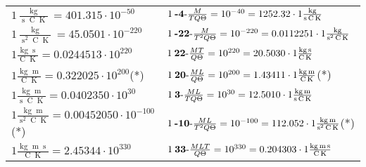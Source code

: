 \begin{center}
\begin{longtable}{l l}
{\color{black}$1 \bm{\mathrm{ }}\frac{\operatorname{kg}}{\operatorname{s}\operatorname{C}\operatorname{K}} = 401.315\cdot10^{-50} $}&
	{\color{black}$1\:\text{\textbf{-4}-} \frac{M}{TQ\Theta}=10^{-40} = 1252.32 \cdot 1 \bm{\mathrm{ }}\frac{\operatorname{kg}}{\operatorname{s}\operatorname{C}\operatorname{K}}$}\\
{\color{black}$1 \bm{\mathrm{ }}\frac{\operatorname{kg}}{\operatorname{s}^2\operatorname{C}\operatorname{K}} = 45.0501\cdot10^{-220} $}&
	{\color{black}$1\:\text{\textbf{-22}-} \frac{M}{T^2Q\Theta}=10^{-220} = 0.0112251 \cdot 1 \bm{\mathrm{ }}\frac{\operatorname{kg}}{\operatorname{s}^2\operatorname{C}\operatorname{K}}$}\\
{\color{black}$1 \bm{\mathrm{ }}\frac{\operatorname{kg}\operatorname{s}}{\operatorname{C}\operatorname{K}} = 0.0244513\cdot10^{220} $}&
	{\color{black}$1\:\text{\textbf{22}-} \frac{MT}{Q\Theta}=10^{220} = 20.5030 \cdot 1 \bm{\mathrm{ }}\frac{\operatorname{kg}\operatorname{s}}{\operatorname{C}\operatorname{K}}$}\\
{\color{black}$1 \bm{\mathrm{ }}\frac{\operatorname{kg}\operatorname{m}}{\operatorname{C}\operatorname{K}} = 0.322025\cdot10^{200} $}\quad(*)&
	{\color{black}$1\:\text{\textbf{20}-} \frac{ML}{Q\Theta}=10^{200} = 1.43411 \cdot 1 \bm{\mathrm{ }}\frac{\operatorname{kg}\operatorname{m}}{\operatorname{C}\operatorname{K}}$}\quad(*)\\
{\color{black}$1 \bm{\mathrm{ }}\frac{\operatorname{kg}\operatorname{m}}{\operatorname{s}\operatorname{C}\operatorname{K}} = 0.0402350\cdot10^{30} $}&
	{\color{black}$1\:\text{\textbf{3}-} \frac{ML}{TQ\Theta}=10^{30} = 12.5010 \cdot 1 \bm{\mathrm{ }}\frac{\operatorname{kg}\operatorname{m}}{\operatorname{s}\operatorname{C}\operatorname{K}}$}\\
{\color{black}$1 \bm{\mathrm{ }}\frac{\operatorname{kg}\operatorname{m}}{\operatorname{s}^2\operatorname{C}\operatorname{K}} = 0.00452050\cdot10^{-100} $}\quad(*)&
	{\color{black}$1\:\text{\textbf{-10}-} \frac{ML}{T^2Q\Theta}=10^{-100} = 112.052 \cdot 1 \bm{\mathrm{ }}\frac{\operatorname{kg}\operatorname{m}}{\operatorname{s}^2\operatorname{C}\operatorname{K}}$}\quad(*)\\
{\color{black}$1 \bm{\mathrm{ }}\frac{\operatorname{kg}\operatorname{m}\operatorname{s}}{\operatorname{C}\operatorname{K}} = 2.45344\cdot10^{330} $}&
	{\color{black}$1\:\text{\textbf{33}-} \frac{MLT}{Q\Theta}=10^{330} = 0.204303 \cdot 1 \bm{\mathrm{ }}\frac{\operatorname{kg}\operatorname{m}\operatorname{s}}{\operatorname{C}\operatorname{K}}$}\\

\end{longtable}
\end{center}
